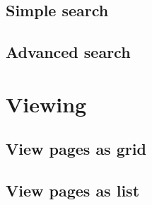 \documentclass[10pt,a4paper]{article}
\begin{document}
\subsection{Simple search}



\subsection{Advanced search}



\section{Viewing}

\subsection{View pages as grid}



\subsection{View pages as list}

\end{document}
